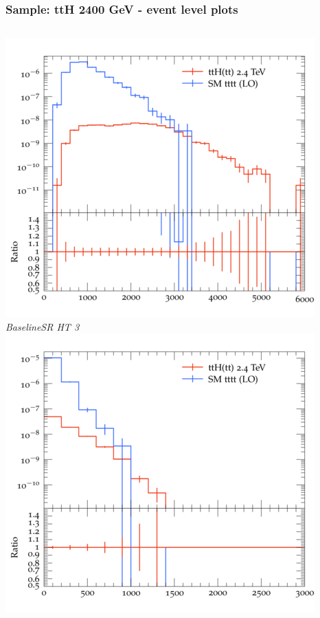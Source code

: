 \documentclass{beamer}
\begin{document}
\begin{frame}
\frametitle{Sample: ttH 2400 GeV - event level plots}
\begin{columns}
\includegraphics[width=\textwidth]{../plots/ttH_2400/tttt_ttH_1LOS/BaselineSR_HT_3.png}\\
\textit{\small BaselineSR HT 3}
\includegraphics[width=\textwidth]{../plots/ttH_2400/tttt_ttH_1LOS/BaselineSR_MET.png}\\

\end{columns}
\end{frame}
\end{document}

